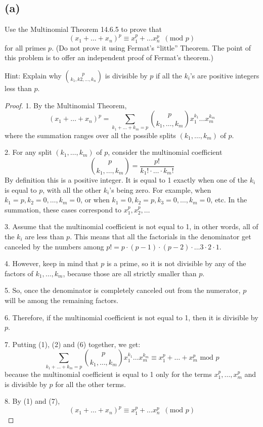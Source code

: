 \documentclass[14pt]{extarticle}
\begin{document}
\subsection{(a)}
Use the Multinomial Theorem 14.6.5 to prove that
$$
(x_1 + \ldots + x_n)^p \equiv x_1^p + \ldots x_n^p \,\,\,(\text{mod}\,\,p)
$$
for all primes $p$. (Do not prove it using Fermat’s “little” Theorem. The point of this problem is to offer an independent proof of Fermat’s theorem.)

Hint: Explain why $\binom{p}{k_1, k 2, \ldots, k_n}$ is divisible by $p$ if all the $k_i$’s are positive integers less than $p$.
\begin{proof}
1. By the Multinomial Theorem,
$$
(x_1 + \ldots + x_n)^p = \sum_{k_1 + \ldots + k_m = p} \binom{p}{k_1, \ldots, k_m}x_1^{k_1} \ldots x_m^{k_m}
$$
where the summation ranges over all the possible splits $(k_1, \ldots, k_m)$ of $p$.

2. For any split $(k_1, \ldots, k_m)$ of $p$, consider the multinomial coefficient 
$$
\binom{p}{k_1, \ldots, k_m} = \frac{p!}{k_1!\cdot\ldots\cdot k_m!}
$$
By definition this is a positive integer. It is equal to 1 exactly when one of the $k_i$ is equal to $p$, with all the other $k_i$'s being zero. For example, when $k_1 = p, k_2 = 0, \ldots, k_m = 0$, or when $k_1 = 0, k_2 = p, k_3 = 0, \ldots, k_m = 0$, etc. In the summation, these cases correspond to $x_1^p, x_2^p, \ldots$

3. Assume that the multinomial coefficient is not equal to 1, in other words, all of the $k_i$ are less than $p$. This means that all the factorials in the denominator get canceled by the numbers among $p! = p \cdot (p-1) \cdot (p-2) \cdot \ldots 3 \cdot 2 \cdot 1$. 

4. However, keep in mind that $p$ is a prime, so it is not divisible by any of the factors of $k_1, \ldots, k_m$, because those are all strictly smaller than $p$. 

5. So, once the denominator is completely canceled out from the numerator, $p$ will be among the remaining factors. 

6. Therefore, if the multinomial coefficient is not equal to 1, then it is divisible by $p$.

7. Putting (1), (2) and (6) together, we get:
$$
\sum_{k_1 + \ldots + k_m = p} \binom{p}{k_1, \ldots, k_m}x_1^{k_1} \ldots x_m^{k_m} \equiv x_1^p + \ldots + x_m^p \text{ mod }p
$$
because the multinomial coefficient is equal to 1 only for the terms $x_1^p, \ldots, x_m^p$ and is divisible by $p$ for all the other terms.

8. By (1) and (7),
$$
(x_1 + \ldots + x_n)^p \equiv x_1^p + \ldots x_n^p \,\,\,(\text{mod}\,\,p)
$$
\end{proof}
\end{document}
